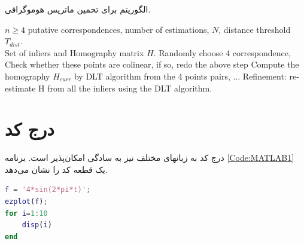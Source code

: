 \begin{algorithm}[t]
\onehalfspacing
\caption{الگوریتم  برای تخمین ماتریس هوموگرافی.} \label{alg:RANSAC}
\begin{latin}
\begin{algorithmic}[1]
\REQUIRE $n\geq4$ putative correspondences, number of estimations, $N$, distance threshold $T_{dist}$.\\
\ENSURE Set of inliers and Homography matrix $H$.
  \STATE Randomly choose 4 correspondence,
  \STATE Check whether these points are colinear, if so, redo the above step
  \STATE Compute the homography $H_{curr}$ by DLT algorithm from the 4 points pairs,
  \STATE $\ldots$ %
  \ENDFOR
  \STATE Refinement: re-estimate H from all the inliers using the DLT algorithm.
\end{algorithmic}
\end{latin}
\end{algorithm}

%



\section{درج کد}
درج کد به زبانهای مختلف نیز به سادگی امکان‌پذیر است. برنامه 
\ref{Code:MATLAB1}
یک قطعه کد  را نشان می‌دهد.
\singlespacing
\begin{lstlisting}[language=MATLAB,breaklines=true,numbers=right, numberstyle=\footnotesize, numbersep=-10pt,  frame=single, breakatwhitespace=false,
caption={نمونه کد \lr{MATLAB}},label={Code:MATLAB1}]
% define a continuous function
f = '4*sin(2*pi*t)';
ezplot(f);
for i=1:10
    disp(i)
end
\end{lstlisting}


